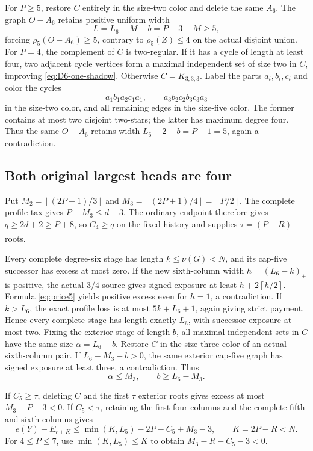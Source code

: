 \documentclass[11pt,a4paper]{article}
\newcommand{\floor}[1]{\left\lfloor#1\right\rfloor}
\newcommand{\ceil}[1]{\left\lceil#1\right\rceil}
\theoremstyle{definition}
\begin{document}
For $P\ge5$, restore $C$ entirely in the size-two color and delete the same $A_6$. The graph $O-A_6$ retains positive uniform width
\[
 L=L_6-M-b=P+3-M\ge5,
\]
forcing $\rho_5(O-A_6)\ge5$, contrary to $\rho_5(Z)\le4$ on the actual disjoint union. For $P=4$, the complement of $C$ is two-regular. If it has a cycle of length at least four, two adjacent cycle vertices form a maximal independent set of size two in $C$, improving \eqref{eq:D6-one-shadow}. Otherwise $C=K_{3,3,3}$. Label the parts $a_i,b_i,c_i$ and color the cycles
\[
 a_1b_1a_2c_1a_1,\qquad a_3b_2c_2b_3c_3a_3
\]
in the size-two color, and all remaining edges in the size-five color. The former contains at most two disjoint two-stars; the latter has maximum degree four. Thus the same $O-A_6$ retains width $L_6-2-b=P+1=5$, again a contradiction.

\subsection{Both original largest heads are four}
Put $M_2=\floor{(2P+1)/3}$ and $M_3=\floor{(2P+1)/4}=\floor{P/2}$. The complete profile tax gives $P-M_3\le d-3$. The ordinary endpoint therefore gives $q\ge2d+2\ge P+8$, so $C_4\ge q$ on the fixed history and supplies $\tau=(P-R)_+$ roots.

Every complete degree-six stage has length $k\le\nu(G)<N$, and its cap-five successor has excess at most zero. If the new sixth-column width $h=(L_6-k)_+$ is positive, the actual $3/4$ source gives signed exposure at least $h+2\ceil{h/2}$. Formula \eqref{eq:price5} yields positive excess even for $h=1$, a contradiction. If $k>L_6$, the exact profile loss is at most $5k+L_6+1$, again giving strict payment. Hence every complete stage has length exactly $L_6$, with successor exposure at most two. Fixing the exterior stage of length $b$, all maximal independent sets in $C$ have the same size $\alpha=L_6-b$. Restore $C$ in the size-three color of an actual sixth-column pair. If $L_6-M_3-b>0$, the same exterior cap-five graph has signed exposure at least three, a contradiction. Thus
\[
 \alpha\le M_3,\qquad b\ge L_6-M_3.
\]

If $C_5\ge\tau$, deleting $C$ and the first $\tau$ exterior roots gives excess at most $M_3-P-3<0$. If $C_5<\tau$, retaining the first four columns and the complete fifth and sixth columns gives
\begin{equation}\label{eq:D6-one-no5}
 e(Y)-E_{r+K}\le
 \min(K,L_5)-2P-C_5+M_3-3,\qquad K=2P-R<N.
\end{equation}
For $4\le P\le7$, use $\min(K,L_5)\le K$ to obtain $M_3-R-C_5-3<0$.
\end{document}
